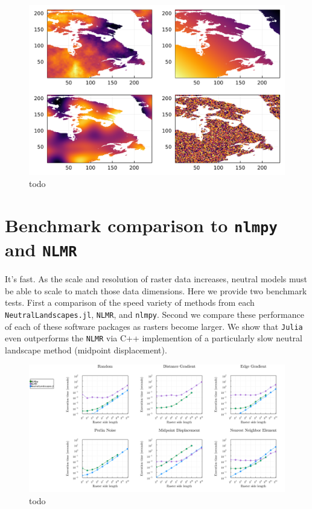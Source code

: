\documentclass[11pt]{article}
\makeatletter
\def\maxwidth{\ifdim\Gin@nat@width>\linewidth\linewidth
\else\Gin@nat@width\fi}
\let\Oldincludegraphics\includegraphics
\renewcommand{\includegraphics}[1]{\Oldincludegraphics[width=\maxwidth]{#1}}
\makeatother
\begin{document}
\begin{figure}
\centering
\includegraphics{./figures/interoperable.png}
\caption{todo}
\end{figure}

\hypertarget{benchmark-comparison-to-nlmpy-and-nlmr}{%
\section{\texorpdfstring{Benchmark comparison to \texttt{nlmpy} and
\texttt{NLMR}}{Benchmark comparison to nlmpy and NLMR}}\label{benchmark-comparison-to-nlmpy-and-nlmr}}

It's fast. As the scale and resolution of raster data increases, neutral
models must be able to scale to match those data dimensions. Here we
provide two benchmark tests. First a comparison of the speed variety of
methods from each \texttt{NeutralLandscapes.jl}, \texttt{NLMR}, and
\texttt{nlmpy}. Second we compare these performance of each of these
software packages as rasters become larger. We show that \texttt{Julia}
even outperforms the \texttt{NLMR} via C++ implemention of a
particularly slow neutral landscape method (midpoint displacement).

\begin{figure}
\centering
\includegraphics{./figures/benchmark.png}
\caption{todo}
\end{figure}
\end{document}
